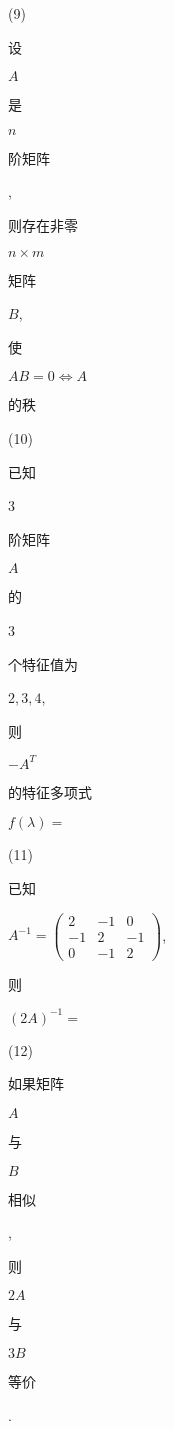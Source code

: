 \documentclass[10pt]{article}
\begin{document}
(9) \begin{CJK}{UTF8}{mj}设\end{CJK} $A$ \begin{CJK}{UTF8}{mj}是\end{CJK} $n$ \begin{CJK}{UTF8}{mj}阶矩阵\end{CJK}, \begin{CJK}{UTF8}{mj}则存在非零\end{CJK} $n \times m$ \begin{CJK}{UTF8}{mj}矩阵\end{CJK} $B$, \begin{CJK}{UTF8}{mj}使\end{CJK} $A B=0 \Leftrightarrow A$ \begin{CJK}{UTF8}{mj}的秩\end{CJK}

(10) \begin{CJK}{UTF8}{mj}已知\end{CJK} 3 \begin{CJK}{UTF8}{mj}阶矩阵\end{CJK} $A$ \begin{CJK}{UTF8}{mj}的\end{CJK} 3 \begin{CJK}{UTF8}{mj}个特征值为\end{CJK} $2,3,4$, \begin{CJK}{UTF8}{mj}则\end{CJK} $-A^{T}$ \begin{CJK}{UTF8}{mj}的特征多项式\end{CJK} $f(\lambda)=$

(11) \begin{CJK}{UTF8}{mj}已知\end{CJK} $A^{-1}=\left(\begin{array}{ccc}2 & -1 & 0 \\ -1 & 2 & -1 \\ 0 & -1 & 2\end{array}\right)$, \begin{CJK}{UTF8}{mj}则\end{CJK} $(2 A)^{-1}=$

(12) \begin{CJK}{UTF8}{mj}如果矩阵\end{CJK} $A$ \begin{CJK}{UTF8}{mj}与\end{CJK} $B$ \begin{CJK}{UTF8}{mj}相似\end{CJK}, \begin{CJK}{UTF8}{mj}则\end{CJK} $2 A$ \begin{CJK}{UTF8}{mj}与\end{CJK} $3 B$ \begin{CJK}{UTF8}{mj}等价\end{CJK}.
\end{document}
